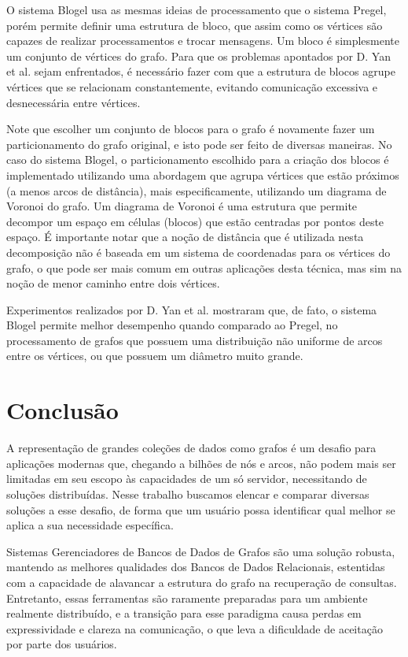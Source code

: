 \documentclass[conference]{IEEEtran}
\begin{document}
O sistema Blogel usa as mesmas ideias de processamento que o sistema
Pregel, porém permite definir uma estrutura de bloco, que assim como os
vértices são capazes de realizar processamentos e trocar mensagens. Um
bloco é simplesmente um conjunto de vértices do grafo. Para que os
problemas apontados por D. Yan et al. sejam enfrentados, é necessário
fazer com que a estrutura de blocos agrupe vértices que se relacionam
constantemente, evitando comunicação excessiva e desnecessária entre
vértices.

Note que escolher um conjunto de blocos para o grafo é novamente fazer
um particionamento do grafo original, e isto pode ser feito de diversas
maneiras. No caso do sistema Blogel, o particionamento escolhido para a
criação dos blocos é implementado utilizando uma abordagem que agrupa
vértices que estão próximos (a menos arcos de distância), mais
especificamente, utilizando um diagrama de Voronoi do grafo. Um diagrama
de Voronoi é uma estrutura que permite decompor um espaço em células
(blocos) que estão centradas por pontos deste espaço. É importante notar
que a noção de distância que é utilizada nesta decomposição não é
baseada em um sistema de coordenadas para os vértices do grafo, o que
pode ser mais comum em outras aplicações desta técnica, mas sim na noção
de menor caminho entre dois vértices.

Experimentos realizados por D. Yan et al. mostraram que, de fato, o
sistema Blogel permite melhor desempenho quando comparado ao Pregel, no
processamento de grafos que possuem uma distribuição não uniforme de
arcos entre os vértices, ou que possuem um diâmetro muito grande.

\section{Conclusão}

A representação de grandes coleções de dados como grafos é um desafio para
aplicações modernas que, chegando a bilhões de nós e arcos, não podem mais ser
limitadas em seu escopo às capacidades de um só servidor, necessitando de
soluções distribuídas. Nesse trabalho buscamos elencar e comparar diversas
soluções a esse desafio, de forma que um usuário possa identificar qual melhor
se aplica a sua necessidade específica.

Sistemas Gerenciadores de Bancos de Dados de Grafos são uma solução robusta,
mantendo as melhores qualidades dos Bancos de Dados Relacionais, estentidas
com a capacidade de alavancar a estrutura do grafo na recuperação de
consultas. Entretanto, essas ferramentas são raramente preparadas para um
ambiente realmente distribuído, e a transição para esse paradigma causa
perdas em expressividade e clareza na comunicação, o que leva a dificuldade
de aceitação por parte dos usuários.
\end{document}
